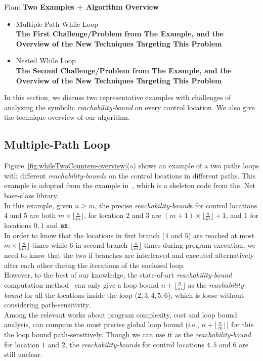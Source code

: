 Plan:
\textbf{Two Examples + Algorithm Overview}
\begin{itemize}
\item {Multiple-Path While Loop}
\\
\textbf{The First Challenge/Problem from The Example, 
and the Overview of the New Techniques Targeting This Problem}
\item {Nested While Loop}
\\
\textbf{The Second Challenge/Problem from The Example,
and the Overview of the New Techniques Targeting This Problem}
\end{itemize}
In this section, we discuss two representative examples with
challenges of analyzing the symbolic
\emph{reachability-bound} on
every control location.
We also give the technique overview of our algorithm.
%
\subsection{Multiple-Path Loop}
\label{sec:overview-multiplepath}

Figure~\ref{fig:whileTwoCounters-overview}(a) shows an example of a two paths loops
with different \emph{reachability-bounds} on the control locations in different paths.
This example is adopted from the example in~\cite{Sumit2010rechability}, which
is a skeleton code from the .Net base-class library.
\\
In this example, given $n \geq m$,
the precise \emph{reachability-bound}s for control locations $4$ and $5$ are both $m \times \lfloor\frac{n}{m}\rfloor$,
for location $2$ and $3$ are $(m + 1) \times \lfloor\frac{n}{m}\rfloor + 1$, 
and $1$ for locations $0, 1$ and $\mathtt{ex}$.
\\
In order to know that the locations in first branch ($4$ and $5$) are reached at most $m \times \lfloor\frac{n}{m}\rfloor$ times
while $6$ in second branch $\lfloor\frac{n}{m}\rfloor$ times
 during program execution,
we need to know that the two if branches are interleaved and executed alternatively after each other
during the iterations of the enclosed loop.
\\
However, to the best of our knowledge, the state-of-art \emph{reachability-bound} computation method~\cite{Sumit2010rechability}
can only give a loop bound $n + \lfloor\frac{n}{m}\rfloor$
as the \emph{reachability-bound} for all the locations inside the loop ($2, 3, 4, 5, 6$), which is loose without considering path-sensitivity.
\\
Among the relevant works about program complexity, cost and loop bound analysis, \cite{GulwaniJK09} can compute the most precise global
loop bound (i.e., $n + \lfloor\frac{n}{m}\rfloor$) for this the loop bound path-sensitively.
Though we can use it as the \emph{reachability-bound} for location $1$ and $2$,
the \emph{reachability-bounds} for control locations $4, 5$ and $6$ are still unclear.
